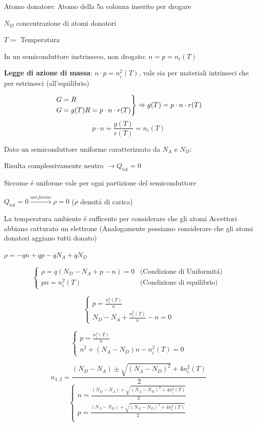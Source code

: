 \documentclass{article}
\begin{document}
Atomo donatore: Atomo della 5a colonna inserito per drogare

$N_D$ concentrazione di atomi donatori

$T\coloneqq$ Temperatura

In un semiconduttore instrinseco, non drogato: $n = p = n_i(T)$

\textbf{Legge di azione di massa}: $n\cdot p = n_i^2(T)$, vale sia per materiali intrinseci che per estrinseci (all'equilibrio)

\[
\begin{rcases}
    G = R\\
    G = g(T)
    R = p\cdot n \cdot r(T)
\end{rcases} \Rightarrow
g(T) = p\cdot n\cdot r(T)
\]
\[ p\cdot n = \frac{g(T)}{r(T)} = n_i(T)\]

Dato un semiconduttore uniforme caratterizzato da $N_A$ e $N_D$:

Risulta complessivamente neutro $\rightarrow Q_{tot} = 0$

Siccome \'e uniforme vale per ogni partizione del semiconduttore

$Q_{tot} = 0 \xrightarrow{uniforme} \rho = 0$ ($\rho$ densit\'a di carica)

La temperatura ambiente \'e sufficente per considerare che gli atomi Accettori abbiano catturato un elettrone (Analogamente possiamo considerare che gli atomi donatori aggiano tutti donato)

$\rho = -qn +qp - qN_A + qN_D$

\[
    \begin{cases}
        \rho = q(N_D - N_A + p -n) = 0 & \text{(Condizione di Uniformit\'a)}\\
        pn = n_i^2(T) & \text{(Condizione di equilibrio)}
    \end{cases}
\]

\[
    \begin{cases}
        p = \frac{n_i^2(T)}{n}\\
        N_D - N_A + \frac{n_i^2(T)}{n} - n = 0
    \end{cases}
\]

\[
    \begin{cases}
        p = \frac{n_i^2(T)}{n}\\
        n^2 + (N_A - N_D) n - n_i^2(T) = 0
    \end{cases}
\]

\[
    n_{1,2} = \frac{(N_D - N_A) \pm \sqrt{{(N_A - N_D)}^2} + 4n_i^2(T)}{2}
\]
\[
    \begin{cases}
        n= \frac{(N_D - N_A) + \sqrt{{(N_A - N_D)}^2 + 4n_i^2(T)}}{2}\\
        p= \frac{(N_A - N_D) + \sqrt{{(N_A - N_D)}^2 + 4n_i^2(T)}}{2}\\
    \end{cases}
\]
\end{document}
